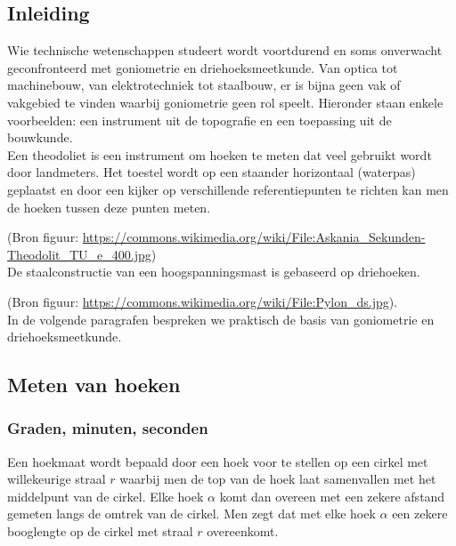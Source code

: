 \subsection*{Inleiding}

Wie technische wetenschappen studeert wordt voortdurend en soms onverwacht geconfronteerd met goniometrie en driehoeksmeetkunde. Van optica tot machinebouw, van elektrotechniek tot staalbouw, er is bijna geen vak of vakgebied te vinden waarbij goniometrie geen rol speelt. Hieronder staan enkele voorbeelden: een instrument uit de topografie en een toepassing uit de bouwkunde.\\

Een theodoliet is een instrument om hoeken te meten dat veel gebruikt wordt door landmeters. Het toestel wordt op een staander horizontaal (waterpas) geplaatst en door een kijker op verschillende referentiepunten te richten kan men de hoeken tussen deze punten meten.


(Bron figuur: \url{https://commons.wikimedia.org/wiki/File:Askania_Sekunden-Theodolit_TU_e_400.jpg})\\

De staalconstructie van een hoogspanningsmast is gebaseerd op driehoeken.


(Bron figuur: \url{https://commons.wikimedia.org/wiki/File:Pylon_ds.jpg}).\\

In de volgende paragrafen bespreken we praktisch de basis van goniometrie en driehoeksmeetkunde.\\

\subsection{Meten van hoeken}

\subsubsection{Graden, minuten, seconden}

Een hoekmaat wordt bepaald door een hoek voor te stellen op een cirkel met willekeurige straal $r$ waarbij men de top van de hoek laat samenvallen met het middelpunt van de cirkel. Elke hoek $\alpha$ komt dan overeen met een zekere afstand gemeten langs de omtrek van de cirkel. Men zegt dat met elke hoek $\alpha$ een zekere booglengte op de cirkel met straal $r$ overeenkomt.

